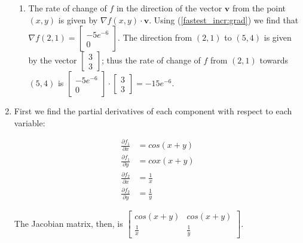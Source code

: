 \documentclass{article}
\begin{document}
\begin{enumerate}
\begin{enumerate}
 \item The rate of change of $f$ in the direction of the vector $\mathbf{v}$
  from the point $(x, y)$ is given by $\nabla f(x,y) \cdot \mathbf{v}$.  Using
  (\ref{fastest_incr:grad}) we find that $\nabla f(2, 1) =
  \begin{bmatrix} -5e^{-6} \\ 0 \end{bmatrix}$.  The direction from $(2, 1)$
  to $(5, 4)$ is given by the vector $\begin{bmatrix} 3 \\ 3 \end{bmatrix}$;
  thus the rate of change of $f$ from $(2, 1)$ towards $(5, 4)$ is
  $\begin{bmatrix} -5e^{-6} \\ 0 \end{bmatrix} \cdot
   \begin{bmatrix} 3 \\ 3 \end{bmatrix} = -15e^{-6}$.

 \end{enumerate}

\item

First we find the partial derivatives of each component with respect to each
variable:

 \begin{align*}
  \frac{\partial f_1}{\partial x} &= cos(x + y) \\
  \frac{\partial f_1}{\partial y} &= cox(x + y) \\
  \frac{\partial f_2}{\partial x} &= \frac{1}{x} \\
  \frac{\partial f_2}{\partial y} &= \frac{1}{y}
 \end{align*}

The Jacobian matrix, then, is
$\begin{bmatrix}
 cos(x + y) & cos(x + y) \\ \frac{1}{x} & \frac{1}{y}
\end{bmatrix}$.

\end{enumerate}
\end{document}
